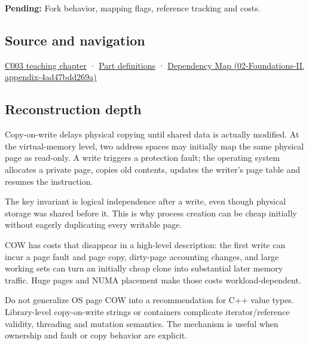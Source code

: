 \textbf{Pending:} Fork behavior, mapping flags, reference tracking and costs.

\subsection{Source and navigation}\label{appendix-7a06e5baac04-source-and-navigation}

\hyperref[01-foundations-i-ch002-where-the-bytes-live]{C003 teaching chapter} · \hyperref[appendix-fd090d982a15-m003---parts-41-60]{Part definitions} · \href{../02-Foundations-II/main.pdf\#nameddest=appendix-4ad47bdd269a}{Dependency Map (02-Foundations-II, appendix-4ad47bdd269a)}

\subsection{Reconstruction depth}\label{appendix-7a06e5baac04-reconstruction-depth}

Copy-on-write delays physical copying until shared data is actually modified. At the virtual-memory level, two address spaces may initially map the same physical page as read-only. A write triggers a protection fault; the operating system allocates a private page, copies old contents, updates the writer's page table and resumes the instruction.

The key invariant is logical independence after a write, even though physical storage was shared before it. This is why process creation can be cheap initially without eagerly duplicating every writable page.

COW has costs that disappear in a high-level description: the first write can incur a page fault and page copy, dirty-page accounting changes, and large working sets can turn an initially cheap clone into substantial later memory traffic. Huge pages and NUMA placement make those costs workload-dependent.

Do not generalize OS page COW into a recommendation for C++ value types. Library-level copy-on-write strings or containers complicate iterator/reference validity, threading and mutation semantics. The mechanism is useful when ownership and fault or copy behavior are explicit.
